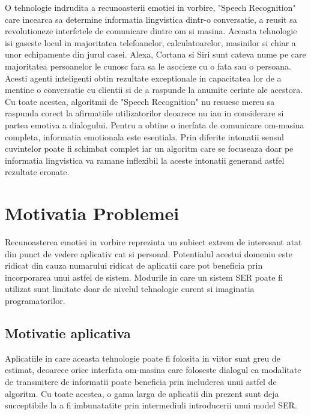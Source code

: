 \documentclass[a4paper,12pt]{book}
\begin{document}
				O tehnologie indrudita a recunoasterii emotiei in vorbire, "Speech Recognition" care incearca sa determine informatia lingvistica dintr-o conversatie, a reusit sa revolutioneze interfetele de comunicare dintre om si masina. Aceasta tehnologie isi gaseste locul in majoritatea telefoanelor, calculatoarelor, masinilor si chiar a unor echipamente din jurul casei. Alexa, Cortana si Siri sunt cateva nume pe care majoritatea persoanelor le cunosc fara sa le asocieze cu o fata sau o persoana. Acesti agenti inteligenti obtin rezultate exceptionale in capacitatea lor de a mentine o conversatie cu clientii si de a raspunde la anumite cerinte ale acestora. Cu toate acestea, algoritmii de "Speech Recognition" nu resuesc mereu sa raspunda corect la afirmatiile utilizatorilor deoarece nu iau in considerare si partea emotiva a dialogului. Pentru a obtine o inerfata de comunicare om-masina completa, informatia emotionala este esentiala. Prin diferite intonatii sensul cuvintelor poate fi schimbat complet iar un algoritm care se focuseaza doar pe informatia lingvistica va ramane inflexibil la aceste intonatii generand astfel rezultate eronate. \par
					

		\section{Motivatia Problemei}
			Recunoasterea emotiei in vorbire reprezinta un subiect extrem de interesant atat din punct de vedere aplicativ cat si personal. Potentialul acestui domeniu este ridicat din cauza numarului ridicat de aplicatii care pot beneficia prin incorporarea unui astfel de sistem. Modurile in care un sistem SER poate fi utilizat sunt limitate doar de nivelul tehnologic curent si imaginatia programatorilor.
			\subsection{Motivatie aplicativa}				
					Aplicatiile in care aceasta tehnologie poate fi folosita in viitor sunt greu de estimat, deoarece orice interfata om-masina care foloseste dialogul ca modalitate de transmitere de informatii poate beneficia prin includerea unui astfel de algoritm. Cu toate acestea, o gama larga de aplicatii din prezent sunt deja succeptibile la a fi imbunatatite prin intermediuli introducerii unui model SER. \par
					
\end{document}
